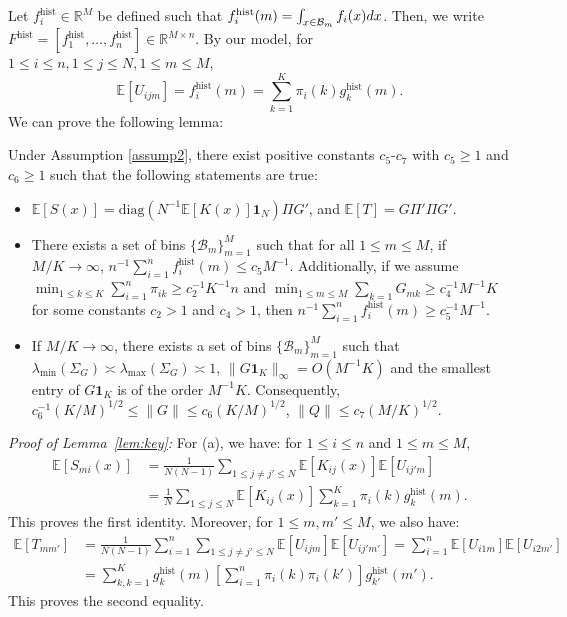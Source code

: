 \documentclass[preprint,11pt]{article}
\newcommand{\mbb}{\mathbb}
\newcommand{\mbf}{\mathbf}
\newcommand{\mcal}{\mathcal}
\numberwithin{equation}{section}
\newcommand{\diag}{\mathrm{diag}}
\begin{document}
Let $f_i^{\text{hist}}\in\mathbb{R}^M$ be defined such that $f_i^{\text{hist}}(m)=\int_{x\in {\cal B}_m}f_i(x)dx$. Then, we write $F^{\text{hist}}=[f_1^{\text{hist}}, \ldots, f_n^{\text{hist}}]\in\mathbb{R}^{M\times n}$. By our model, for $1\leq i\leq n,1\leq j\leq N,1\leq m\leq M$, 
\[
\mathbb{E}[U_{ijm}] = f_i^{\text{hist}}(m)= \sum_{k=1}^K\pi_i(k)g_k^{\text{hist}}(m). 
\]
We can prove the following lemma:
\begin{lemma} \label{lem:key}
Under Assumption \ref{assump2}, there exist positive constants $c_5$-$c_7$ with $c_5\ge  1$ and $c_6\ge 1$ such that the following statements are true:
\begin{itemize}
\item[(a)] $\mathbb{E}[S(x)] =\diag(N^{-1}\mbb{E}[K(x)]\bm{1}_N)\Pi G' $, and $\mathbb{E}[T] = G\Pi'\Pi G' $.
\item[(b)] There exists a set of bins $\{\mcal{B}_m\}_{m=1}^M$ such that for all $1\le m\le M$, if $M/K\rightarrow \infty$, $n^{-1}\sum_{i=1}^nf_i^{\text{hist}}(m) \leq c_5M^{-1}$. Additionally, if we assume $\min_{1\le k\le K}\sum_{i=1}^n\pi_{ik}\ge c_2^{-1}K^{-1}n$ and $\min_{1\le m\le M}\sum_{k=1}G_{mk}\ge c_4^{-1}M^{-1}K$ for some constants $c_2>1$ and $c_4>1$, then $n^{-1}\sum_{i=1}^nf_i^{\text{hist}}(m) \geq c_5^{-1}M^{-1}$.
\item [(c)] If $M/K\rightarrow\infty$, there exists a set of bins $\{\mcal{B}_m\}_{m=1}^M$ such that $\lambda_{\min}(\Sigma_G)\asymp \lambda_{\max}(\Sigma_G)\asymp 1$, $\|G\mbf{1}_K\|_{\infty}=O(M^{-1}K)$ and the smallest entry of $G\mbf{1}_K$ is of the order $M^{-1}K$. Consequently, $c_6^{-1}(K/M)^{1/2}\le \|G\|\le c_6(K/M)^{1/2}$, $ \|Q\|\le c_7(M/K)^{1/2}$.
\end{itemize}
\end{lemma}


\noindent
{\it Proof of Lemma~\ref{lem:key}:} For (a), we have: for $1\le i\le n$ and $1\le m\le M$,
\begin{align*}
    \mbb{E}[S_{mi}(x)] &= \frac{1}{N(N-1)}\sum_{1\leq j\neq j'\leq N} \mbb{E}[K_{ij}(x)] \mbb{E}[U_{ij'm}]\\
    &=\frac{1}{N}\sum_{1\leq j\leq N} \mbb{E}[K_{ij}(x)] \sum_{k=1}^K\pi_i(k)g_k^{\text{hist}}(m).
\end{align*}
This proves the first identity. Moreover, for $1\le m,m'\le M$, we also have:
\begin{align*}
    \mbb{E}[T_{mm'}]&=\frac{1}{N(N-1)}  \sum_{i=1}^n \sum_{1\leq j\neq j'\leq N} \mbb{E}[U_{ijm}]\mbb{E}[U_{ij'm'}]=\sum_{i=1}^n\mbb{E}[U_{i1m}]\mbb{E}[U_{i2m'}]\\
    &=\sum_{k,k=1}^Kg_k^{\text{hist}}(m)\left[\sum_{i=1}^n\pi_i(k)\pi_i(k')\right]g_{k'}^{\text{hist}}(m').
\end{align*}
This proves the second equality.
\end{document}
